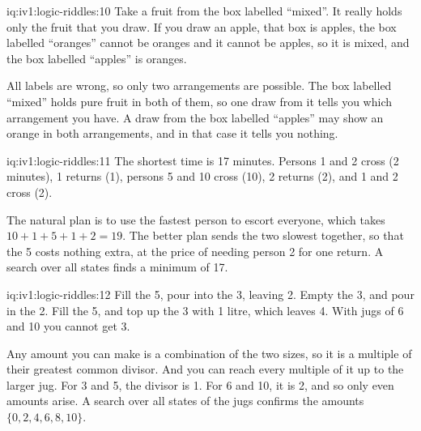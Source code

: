 \begin{solution}{iq:iv1:logic-riddles:10}
Take a fruit from the box labelled ``mixed''. It really holds only the fruit that you draw. If you draw an apple, that box is apples, the box labelled ``oranges'' cannot be oranges and it cannot be apples, so it is mixed, and the box labelled ``apples'' is oranges.

All labels are wrong, so only two arrangements are possible. The box labelled ``mixed'' holds pure fruit in both of them, so one draw from it tells you which arrangement you have. A draw from the box labelled ``apples'' may show an orange in both arrangements, and in that case it tells you nothing.

\end{solution}

\begin{solution}{iq:iv1:logic-riddles:11}
The shortest time is 17 minutes. Persons 1 and 2 cross (2 minutes), 1 returns (1), persons 5 and 10 cross (10), 2 returns (2), and 1 and 2 cross (2).

The natural plan is to use the fastest person to escort everyone, which takes $10 + 1 + 5 + 1 + 2 = 19$. The better plan sends the two slowest together, so that the 5 costs nothing extra, at the price of needing person 2 for one return. A search over all states finds a minimum of 17.

\end{solution}

\begin{solution}{iq:iv1:logic-riddles:12}
Fill the 5, pour into the 3, leaving 2. Empty the 3, and pour in the 2. Fill the 5, and top up the 3 with 1 litre, which leaves 4. With jugs of 6 and 10 you cannot get 3.

Any amount you can make is a combination of the two sizes, so it is a multiple of their greatest common divisor. And you can reach every multiple of it up to the larger jug. For 3 and 5, the divisor is 1. For 6 and 10, it is 2, and so only even amounts arise. A search over all states of the jugs confirms the amounts $\{0, 2, 4, 6, 8, 10\}$.

\end{solution}

